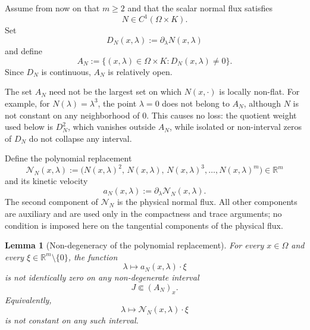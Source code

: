 \documentclass[11pt]{amsart}
\numberwithin{equation}{section}
\theoremstyle{plain}
\newtheorem{lemma}[theorem]{Lemma}
\theoremstyle{definition}
\theoremstyle{remark}
\begin{document}
Assume from now on that \(m\ge2\) and that the scalar normal flux satisfies
\[
    N\in C^1(\Omega\times K).
\]
Set
\begin{equation}
\label{eq:normal-derivative-D}
    D_N(x,\lambda)
    :=
    \partial_\lambda N(x,\lambda)
\end{equation}
and define
\begin{equation}
\label{eq:normal-nondegenerate-region}
    A_N
    :=
    \bigl\{
        (x,\lambda)\in\Omega\times K:
        D_N(x,\lambda)\neq0
    \bigr\}.
\end{equation}
Since \(D_N\) is continuous, \(A_N\) is relatively open.

The set \(A_N\) need not be the largest set on which
\(N(x,\cdot)\) is locally non-flat.  For example, for
\(N(\lambda)=\lambda^3\), the point \(\lambda=0\) does not belong to \(A_N\),
although \(N\) is not constant on any neighborhood of \(0\).  This causes no
loss: the quotient weight used below is \(D_N^2\), which vanishes outside
\(A_N\), while isolated or non-interval zeros of \(D_N\) do not collapse any
interval.

Define the polynomial replacement
\begin{equation}
\label{eq:polynomial-replaced-normal-vector}
    \mathcal N_N(x,\lambda)
    :=
    \bigl(
        N(x,\lambda)^2,\,
        N(x,\lambda),\,
        N(x,\lambda)^3,\ldots,
        N(x,\lambda)^m
    \bigr)
    \in\mathbb R^m
\end{equation}
and its kinetic velocity
\begin{equation}
\label{eq:polynomial-kinetic-velocity}
    a_N(x,\lambda)
    :=
    \partial_\lambda\mathcal N_N(x,\lambda).
\end{equation}
The second component of \(\mathcal N_N\) is the physical normal flux.  All
other components are auxiliary and are used only in the compactness and trace
arguments; no condition is imposed here on the tangential components of the
physical flux.

\begin{lemma}[Non-degeneracy of the polynomial replacement]
\label{lem:polynomial-replacement-nondeg}
For every \(x\in\Omega\) and every
\(\xi\in\mathbb R^m\setminus\{0\}\), the function
\[
    \lambda\longmapsto
    a_N(x,\lambda)\cdot\xi
\]
is not identically zero on any non-degenerate interval
\[
    J\Subset(A_N)_x.
\]
Equivalently,
\[
    \lambda\longmapsto
    \mathcal N_N(x,\lambda)\cdot\xi
\]
is not constant on any such interval.
\end{lemma}
\end{document}
